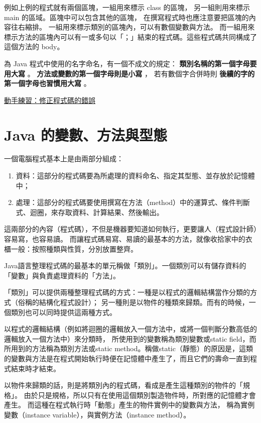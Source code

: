 \documentclass[a4paper,12pt,english]{sphinxmanual}
\begin{document}
例如上例的程式就有兩個區塊，一組用來標示 class 的區塊，
另一組則用來標示 main 的區域。區塊中可以包含其他的區塊，
在撰寫程式時也應注意要把區塊的內容往右縮排。
一組用來標示類別的區塊內，可以有數個變數與方法。
而一組用來標示方法的區塊內可以有一或多句以「；」結束的程式碼。這些程式碼共同構成了這個方法的 body。

為 Java 程式中使用的名字命名，有一個不成文的規定：
\textbf{類別名稱的第一個字母要用大寫} 。
\textbf{方法或變數的第一個字母則是小寫} ，
若有數個字合併時則 \textbf{後續的字的第一個字母也習慣用大寫} 。

\href{http://v2.plweb.org/webstart.groovy?mode=student\&course\_id=158\&lesson\_id=2\&class\_id=2011100006}{動手練習：修正程式碼的錯誤}


\chapter{Java 的變數、方法與型態}
\label{java_basis:java}\label{java_basis::doc}
一個電腦程式基本上是由兩部分組成：
\begin{enumerate}
\item {} 
資料：這部分的程式碼要為所處理的資料命名、指定其型態、並存放於記憶體中；

\item {} 
處理：這部分的程式碼要使用撰寫在方法（method）中的運算式、條件判斷式、迴圈，來存取資料、計算結果、然後輸出。

\end{enumerate}

這兩部分的內容（程式碼），不但是機器要知道如何執行，更要讓人（程式設計師）容易寫，也容易讀。
而讓程式碼易寫、易讀的最基本的方法，就像收拾家中的衣櫃一般：按照種類與性質，分別放置整齊。

Java語言整理程式碼的最基本的單元稱做「類別」。一個類別可以有儲存資料的「變數」與負責處理資料的「方法」。

「類別」可以提供兩種整理程式碼的方式：一種是以程式的邏輯結構當作分類的方式（俗稱的結構化程式設計）；
另一種則是以物件的種類來歸類。而有的時候，一個類別也可以同時提供這兩種方式。

以程式的邏輯結構（例如將迴圈的邏輯放入一個方法中，或將一個判斷分數高低的邏輯放入一個方法中）來分類時，
所使用到的變數稱為類別變數或static field，而所用到的方法稱為類別方法或static method。稱做static（靜態）的原因是，這類的變數與方法是在程式開始執行時便在記憶體中產生了，而且它們的壽命一直到程式結束時才結束。

以物件來歸類的話，則是將類別內的程式碼，看成是產生這種類別的物件的「規格」。
由於只是規格，所以只有在使用這個類別製造物件時，所對應的記憶體才會產生。
而這種在程式執行時「動態」產生的物件實例中的變數與方法，
稱為實例變數（instance variable），與實例方法（instance method）。
\end{document}
